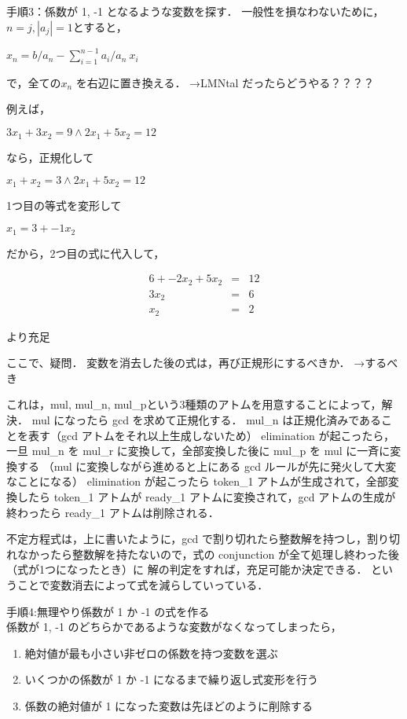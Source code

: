 手順3：係数が 1, -1 となるような変数を探す．
一般性を損なわないために，$n=j, |a_j|=1$とすると，
\begin{center}
    $x_n = b/a_n - \sum_{i=1}^{n-1}a_i/a_n \:x_i$
\end{center}
で，全ての$x_n$ を右辺に置き換える．
→LMNtal だったらどうやる？？？？

例えば，
\begin{center}
    $3x_1 + 3x_2 = 9 \wedge 2x_1 + 5x_2 = 12$
\end{center}
なら，正規化して
\begin{center}
    $x_1 + x_2 = 3 \wedge 2x_1 + 5x_2 = 12$
\end{center}
1つ目の等式を変形して
\begin{center}
    $x_1 = 3 + -1x_2$
\end{center}
だから，2つ目の式に代入して，
\begin{center}
    \begin{eqnarray}
        6 + -2x_2 + 5x_2 &=& 12\\
        3x_2 &=& 6\\
        x_2 &=& 2
    \end{eqnarray}
\end{center}
より充足


ここで、疑問．
変数を消去した後の式は，再び正規形にするべきか．
→するべき

これは，mul, mul\_n, mul\_pという3種類のアトムを用意することによって，解決．
mul になったら gcd を求めて正規化する．
mul\_n は正規化済みであることを表す（gcd アトムをそれ以上生成しないため）
elimination が起こったら，一旦 mul\_n を mul\_r に変換して，全部変換した後に mul\_p を mul に一斉に変換する
（mul に変換しながら進めると上にある gcd ルールが先に発火して大変なことになる）
elimination が起こったら token\_1 アトムが生成されて，全部変換したら token\_1 アトムが ready\_1 アトムに変換されて，gcd アトムの生成が終わったら ready\_1 アトムは削除される．

不定方程式は，上に書いたように，gcd で割り切れたら整数解を持つし，割り切れなかったら整数解を持たないので，式の conjunction が全て処理し終わった後（式が1つになったとき）に
解の判定をすれば，充足可能か決定できる．
ということで変数消去によって式を減らしていっている．

手順4:無理やり係数が 1 か -1 の式を作る\\
係数が 1, -1 のどちらかであるような変数がなくなってしまったら，
\begin{enumerate}
    \item 絶対値が最も小さい非ゼロの係数を持つ変数を選ぶ
    \item いくつかの係数が 1 か -1 になるまで繰り返し式変形を行う
    \item 係数の絶対値が 1 になった変数は先ほどのように削除する
\end{enumerate} 

